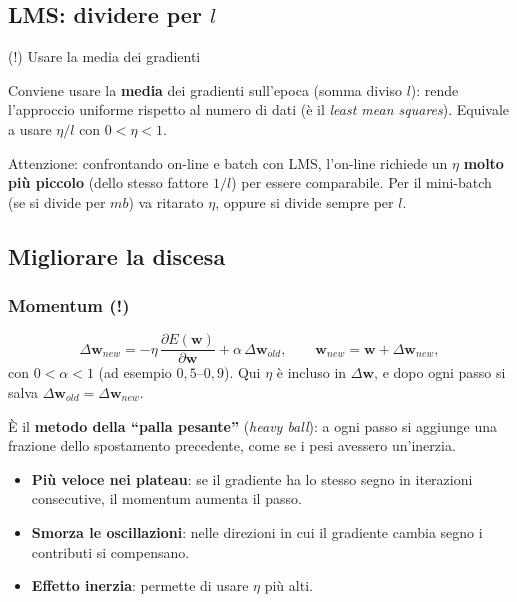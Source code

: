 \subsection{\texorpdfstring{LMS: dividere per
\(l\)}{LMS: dividere per l}}\label{lms-dividere-per-l}

\begin{boxtip}{(!) Usare la media dei gradienti}

Conviene usare la \textbf{media} dei gradienti sull'epoca (somma diviso
\(l\)): rende l'approccio uniforme rispetto al numero di dati (è il
\emph{least mean squares}). Equivale a usare \(\eta/l\) con
\(0 < \eta < 1\).

Attenzione: confrontando on-line e batch con LMS, l'on-line richiede un
\(\eta\) \textbf{molto più piccolo} (dello stesso fattore \(1/l\)) per
essere comparabile. Per il mini-batch (se si divide per \(mb\)) va
ritarato \(\eta\), oppure si divide sempre per \(l\).

\end{boxtip}

\subsection{Migliorare la discesa}\label{migliorare-la-discesa}

\subsubsection{Momentum (!)}\label{momentum}

\[
\Delta\mathbf{w}_{new} = -\eta\,\frac{\partial E(\mathbf{w})}{\partial\mathbf{w}} + \alpha\,\Delta\mathbf{w}_{old}, \qquad \mathbf{w}_{new} = \mathbf{w} + \Delta\mathbf{w}_{new},
\] con \(0 < \alpha < 1\) (ad esempio \(0{,}5\)--\(0{,}9\)). Qui
\(\eta\) è incluso in \(\Delta\mathbf{w}\), e dopo ogni passo si salva
\(\Delta\mathbf{w}_{old} = \Delta\mathbf{w}_{new}\).

È il \textbf{metodo della ``palla pesante''} (\emph{heavy ball}): a ogni
passo si aggiunge una frazione dello spostamento precedente, come se i
pesi avessero un'inerzia.

\begin{itemize}
\tightlist
\item
  \textbf{Più veloce nei plateau}: se il gradiente ha lo stesso segno in
  iterazioni consecutive, il momentum aumenta il passo.
\item
  \textbf{Smorza le oscillazioni}: nelle direzioni in cui il gradiente
  cambia segno i contributi si compensano.
\item
  \textbf{Effetto inerzia}: permette di usare \(\eta\) più alti.
\end{itemize}

